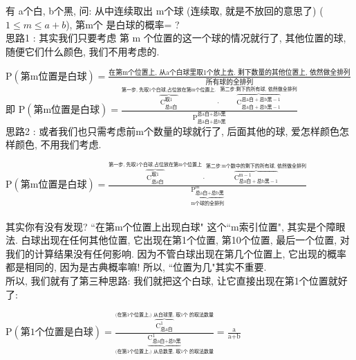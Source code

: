 \documentclass[UTF8]{ctexart}
\begin{document}
	
	\begin{myEnvSample}
		有 a个白, b个黑, 问: 从中连续取出 m个球 (连续取, 就是不放回的意思了) ($1 \leq m \leq a+b$), 第m个 是白球的概率= ? \\
		
		思路1 : 其实我们只要考虑 第 m 个位置的这一个球的情况就行了, 其他位置的球,随便它们什么颜色, 我们不用考虑的.
		
		$\text{P}\left( \text{第m位置是白球} \right) =\frac{\text{在第m个位置上,\ 从a个白球里取1个放上去.\ 剩下数量的其他位置上,\ 依然做全排列}}{\text{所有球的全排列}}
		$ \\
		
		即 $	\text{P}\left( \text{第m位置是白球} \right) =\frac{\overset{\text{第一步,\ 先取1个白球,占位放在第m个位置上.}}{\overbrace{\text{C}_{\text{总a白}}^{\text{取}1}}}\cdot \overset{\text{第二步:剩下的所有球,\ 依然做全排列}}{\overbrace{\text{C}_{\text{总a白}+\text{总b黑}-1}^{\text{总a白}+\text{总b黑}-1}}}}{\text{P}_{\text{总a白}+\text{总b黑}}^{\text{总a白}+\text{总b黑}}}
		$ \\
		
		
		思路2 : 或者我们也只需考虑前m个数量的球就行了, 后面其他的球, 爱怎样颜色怎样颜色, 不用我们考虑.
		
		$	\text{P}\left( \text{第m位置是白球} \right) =\frac{\overset{\text{第一步,\ 先取1个白球,占位放在第m个位置上}}{\overbrace{\text{C}_{\text{总a白}}^{\text{取}1}}}\cdot \overset{\text{第二步:m个数中的剩下的所有球,\ 依然做全排列}}{\overbrace{\text{C}_{\text{总a白}+\text{总b黑}-1}^{\text{m}-1}}}}{\underset{\text{m个球的全排列}}{\underbrace{\text{P}_{\text{总a白}+\text{总b黑}}^{\text{m}}}}}
		$ \\
		\\
		
		其实你有没有发现? ``在第m个位置上出现白球" 这个``m索引位置", 其实是个障眼法. 白球出现在任何其他位置, 它出现在第1个位置, 第10个位置, 最后一个位置, 对我们的计算结果没有任何影响.  因为不管白球出现在第几个位置上, 它出现的概率都是相同的, 因为是古典概率嘛! 所以, ``位置为几"其实不重要. \\
		
		所以, 我们就有了第三种思路: 我们就把这个白球, 让它直接出现在第1个位置就好了:
		
		$	\text{P}\left( \text{第1个位置是白球} \right) =\frac{\overset{\text{(在第1个位置上,)\ 从白球里,\ 取1个\ 的取法数量}}{\overbrace{\text{C}_{\text{总a白}}^{1}}}}{\underset{\text{(在第1个位置上,)\ 从总数里,\ 取1个\ 的取法数量}}{\underbrace{\text{C}_{\text{总a白}+\text{总b黑}}^{1}}}}=\frac{\text{a}}{\text{a}+\text{b}}
		$		
	\end{myEnvSample}
	
	
	
	
	
	
	
\end{document}
